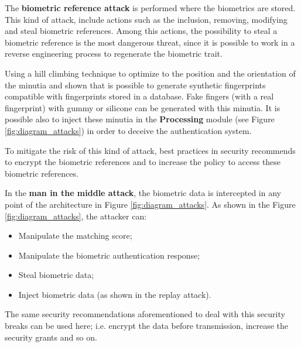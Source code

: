 
The \textbf{biometric reference attack} is performed where the biometrics are stored. This kind of attack, include actions such as the inclusion, removing, modifying and steal biometric references. Among this actions, the possibility to steal a biometric reference is the most dangerous threat, since it is possible to work in a reverse engineering process to regenerate the biometric trait. 

Using a hill climbing technique to optimize to the position and the orientation of the minutia \cite{MartinezDiaz2006} and \cite{hill2001risk} shown that is possible to generate synthetic fingerprints compatible with fingerprints stored in a database. Fake fingers (with a real fingerprint) with gummy or silicone can be generated with this minutia. It is possible also to inject these minutia in the \textbf{Processing} module (see Figure \ref{fig:diagram_attacks}) in order to deceive the authentication system. 

To mitigate the risk of this kind of attack, best practices in security recommends to encrypt the biometric references and to increase the policy to access these biometric references. 


In the \textbf{man in the middle attack}, the biometric data is intercepted in any point of the architecture in Figure \ref{fig:diagram_attacks}.  As shown in the Figure \ref{fig:diagram_attacks}, the attacker can:
\begin{itemize}
        \item Manipulate the matching score;
        \item Manipulate the biometric authentication response;
        \item Steal biometric data;
        \item Inject biometric data (as shown in the replay attack).
\end{itemize}

The same security recommendations aforementioned to deal with this security breaks can be used here; i.e. encrypt the data before transmission, increase the security grants and so on. 

